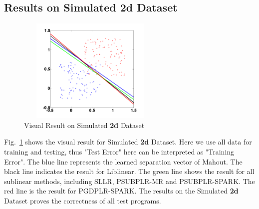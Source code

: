 \documentclass{llncs}
\begin{document}
\subsection{Results on Simulated 2d Dataset}
\begin{figure}[tb] \label{fig:02}
\center \includegraphics[height=5cm,width=7cm]{img/2d-show.png}
\caption{Visual Result on Simulated \textbf{2d} Dataset}
\end{figure}
Fig.~\ref{fig:02} shows the visual result for Simulated \textbf{2d} Dataset.
Here we use all data for training and testing, thus "Test Error" here can be interpreted as "Training Error".
The blue line represents the learned separation vector of Mahout.
The black line indicates the result for Liblinear.
The green line shows the result for all sublinear methods, including SLLR, PSUBPLR-MR and PSUBPLR-SPARK.
The red line is the result for PGDPLR-SPARK.
The results on the Simulated \textbf{2d} Dataset proves the correctness of all test programs.
\end{document}

